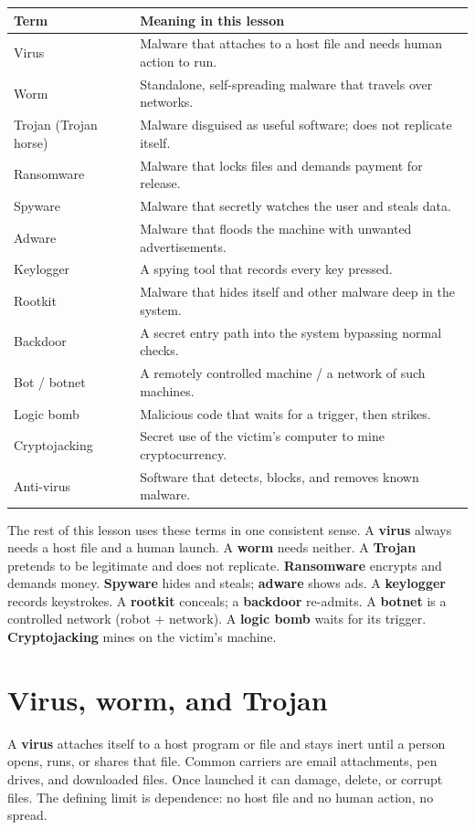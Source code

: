 \begin{center}
\begin{tabular}{p{}p{}}
\toprule
\textbf{Term} & \textbf{Meaning in this lesson} \\
\midrule
Virus & Malware that attaches to a host file and needs human action to run. \\
Worm & Standalone, self-spreading malware that travels over networks. \\
Trojan (Trojan horse) & Malware disguised as useful software; does not replicate itself. \\
Ransomware & Malware that locks files and demands payment for release. \\
Spyware & Malware that secretly watches the user and steals data. \\
Adware & Malware that floods the machine with unwanted advertisements. \\
Keylogger & A spying tool that records every key pressed. \\
Rootkit & Malware that hides itself and other malware deep in the system. \\
Backdoor & A secret entry path into the system bypassing normal checks. \\
Bot / botnet & A remotely controlled machine / a network of such machines. \\
Logic bomb & Malicious code that waits for a trigger, then strikes. \\
Cryptojacking & Secret use of the victim's computer to mine cryptocurrency. \\
Anti-virus & Software that detects, blocks, and removes known malware. \\
\bottomrule
\end{tabular}
\end{center}

The rest of this lesson uses these terms in one consistent sense. A
\textbf{virus} always needs a host file and a human launch. A \textbf{worm}
needs neither. A \textbf{Trojan} pretends to be legitimate and does not
replicate. \textbf{Ransomware} encrypts and demands money.
\textbf{Spyware} hides and steals; \textbf{adware} shows ads. A
\textbf{keylogger} records keystrokes. A \textbf{rootkit} conceals; a
\textbf{backdoor} re-admits. A \textbf{botnet} is a controlled network (robot
+ network). A \textbf{logic bomb} waits for its trigger.
\textbf{Cryptojacking} mines on the victim's machine.

\section{Virus, worm, and Trojan}
A \textbf{virus} attaches itself to a host program or file and stays inert
until a person opens, runs, or shares that file. Common carriers are email
attachments, pen drives, and downloaded files. Once launched it can damage,
delete, or corrupt files. The defining limit is dependence: no host file
and no human action, no spread.


